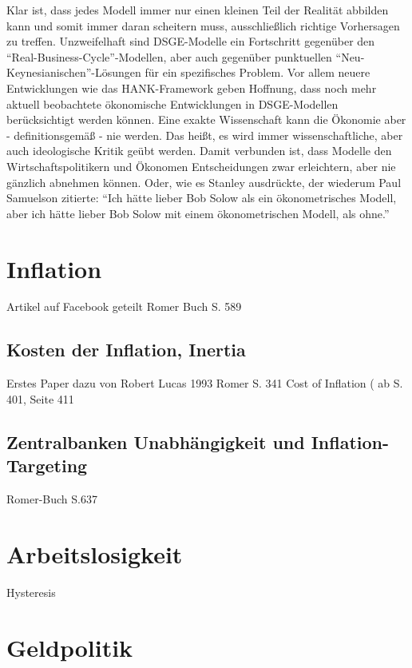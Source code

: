 Klar ist, dass jedes Modell immer nur einen kleinen Teil der Realität abbilden kann und somit immer daran scheitern muss, ausschließlich richtige Vorhersagen zu treffen. Unzweifelhaft sind DSGE-Modelle ein Fortschritt gegenüber den "`Real-Business-Cycle"'-Modellen, aber auch gegenüber punktuellen "`Neu-Keynesianischen"'-Lösungen für ein spezifisches Problem. Vor allem neuere Entwicklungen wie das HANK-Framework geben Hoffnung, dass noch mehr aktuell beobachtete ökonomische Entwicklungen in DSGE-Modellen berücksichtigt werden können. Eine exakte Wissenschaft kann die Ökonomie aber - definitionsgemäß - nie werden. Das heißt, es wird immer wissenschaftliche, aber auch ideologische Kritik geübt werden. Damit verbunden ist, dass Modelle den Wirtschaftspolitikern und Ökonomen Entscheidungen zwar erleichtern, aber nie gänzlich abnehmen können. Oder, wie es Stanley \textcite{Fischer2017} ausdrückte, der wiederum Paul Samuelson zitierte: "`Ich hätte lieber Bob Solow als ein ökonometrisches Modell, aber ich hätte lieber Bob Solow mit einem ökonometrischen Modell, als ohne."'




\section{Inflation}
\label{Inflation}

Artikel auf Facebook geteilt
Romer Buch S. 589


\subsection{Kosten der Inflation, Inertia}
Erstes Paper dazu von Robert Lucas 1993
Romer S. 341
Cost of Inflation (\textcite{Snowdon2005} ab S. 401, Seite 411 

\subsection{Zentralbanken Unabhängigkeit und Inflation-Targeting}
Romer-Buch S.637


\section{Arbeitslosigkeit}
Hysteresis








\section{Geldpolitik}
\label{Geldpolitik}


